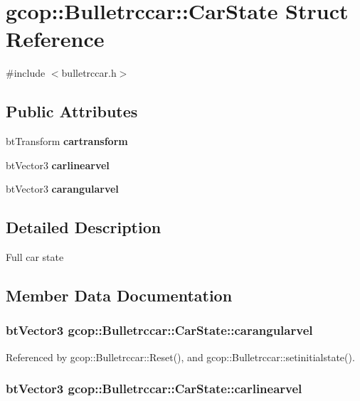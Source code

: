 \section{gcop\-:\-:\-Bulletrccar\-:\-:\-Car\-State \-Struct \-Reference}
\label{structgcop_1_1Bulletrccar_1_1CarState}


{\ttfamily \#include $<$bulletrccar.\-h$>$}

\subsection*{\-Public \-Attributes}
\begin{DoxyCompactItemize}
\item 
bt\-Transform {\bf cartransform}
\item 
bt\-Vector3 {\bf carlinearvel}
\item 
bt\-Vector3 {\bf carangularvel}
\end{DoxyCompactItemize}


\subsection{\-Detailed \-Description}
\-Full car state 

\subsection{\-Member \-Data \-Documentation}
\subsubsection[{carangularvel}]{\setlength{\rightskip}{0pt plus 5cm}bt\-Vector3 {\bf gcop\-::\-Bulletrccar\-::\-Car\-State\-::carangularvel}}\label{structgcop_1_1Bulletrccar_1_1CarState_a76d05b2f2ae6538857d0463ca8e51d31}


\-Referenced by gcop\-::\-Bulletrccar\-::\-Reset(), and gcop\-::\-Bulletrccar\-::setinitialstate().

\subsubsection[{carlinearvel}]{\setlength{\rightskip}{0pt plus 5cm}bt\-Vector3 {\bf gcop\-::\-Bulletrccar\-::\-Car\-State\-::carlinearvel}}\label{structgcop_1_1Bulletrccar_1_1CarState_aea19046c81dd1d27e1c67d6c41573dcc}


